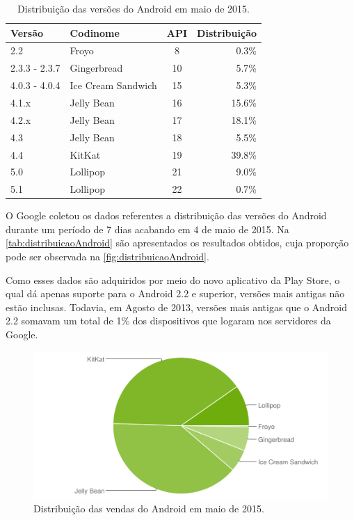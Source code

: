 \documentclass[a4paper,12pt,brazil,oneside]{book}
\begin{document}
\begin{table}[htb!]
  \centering
    \begin{tabular}{llcr}
     \rowcolor{Gray} \hline 
    Versão        	& Codinome           	& API & Distribuição \\ \hline \hline
    2.2           	& Froyo              	& 8   & 0.3\%        \\ 
    2.3.3 - 2.3.7 	& Gingerbread        	& 10  & 5.7\%       \\ 
    4.0.3 - 4.0.4 	& Ice Cream Sandwich 	& 15  & 5.3\%       \\ 
    4.1.x         	& Jelly Bean         	& 16  & 15.6\%       \\ 
    4.2.x         	& Jelly Bean         	& 17  & 18.1\%        \\
    4.3			& Jelly Bean         	& 18  & 5.5\%        \\ 
    4.4         	& KitKat		& 19  & 39.8\%        \\
    5.0           	& Lollipop          	& 21  & 9.0\%        \\ 
    5.1           	& Lollipop          	& 22  & 0.7\%        \\ 
    \end{tabular}
    \caption{Distribuição das versões do Android em maio de 2015.}
     \label{tab:distribuicaoAndroid}
\end{table}

O Google coletou os dados referentes a distribuição das versões do Android durante um período de 7 dias acabando em 4 de maio de 2015. Na \autoref{tab:distribuicaoAndroid} são apresentados os resultados obtidos, cuja proporção pode ser observada na \autoref{fig:distribuicaoAndroid}. 

Como esses dados são adquiridos por meio do novo aplicativo da Play Store, o qual dá apenas suporte para o Android 2.2 e superior, versões mais antigas não estão inclusas. Todavia, em Agosto de 2013, versões mais antigas que o Android 2.2 somavam um total de 1\% dos dispositivos que logaram nos servidores da Google.

\begin{figure}[H]
  \centering
  \includegraphics[width=.75\textwidth]{figuras/introducao/chart.png}
  \caption{Distribuição das vendas do Android em maio de 2015.}
  \label{fig:distribuicaoAndroid}
\end{figure}
\end{document}
